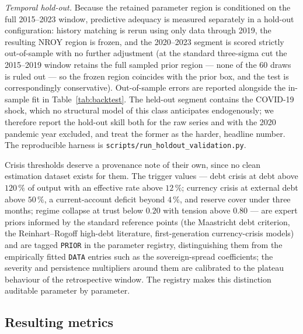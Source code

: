 \documentclass[a4paper,fleqn]{cas-sc}
\begin{document}
\emph{Temporal hold-out.} Because the retained parameter region is conditioned on the full
2015--2023 window, predictive adequacy is measured separately in a hold-out configuration:
history matching is rerun using only data through 2019, the resulting NROY region is
frozen, and the 2020--2023 segment is scored strictly out-of-sample with no further
adjustment (at the standard three-sigma cut the 2015--2019 window retains the full sampled
prior region --- none of the 60 draws is ruled out --- so the frozen region coincides with
the prior box, and the test is correspondingly conservative). Out-of-sample errors are
reported alongside the in-sample fit in Table~\ref{tab:backtest}. The held-out segment
contains the COVID-19 shock, which no structural model of this class anticipates
endogenously; we therefore report the hold-out skill both for the raw series and with the
2020 pandemic year excluded, and treat the former as the harder, headline number. The
reproducible harness is \texttt{scripts/run\_holdout\_validation.py}.

Crisis thresholds deserve a provenance note of their own, since no clean estimation dataset
exists for them. The trigger values --- debt crisis at debt above $120\,\%$ of output with an
effective rate above $12\,\%$; currency crisis at external debt above $50\,\%$, a
current-account deficit beyond $4\,\%$, and reserve cover under three months; regime collapse at
trust below $0.20$ with tension above $0.80$ --- are expert priors informed by the standard
reference points (the Maastricht debt criterion, the Reinhart--Rogoff high-debt literature,
first-generation currency-crisis models) and are tagged \texttt{PRIOR} in the parameter registry,
distinguishing them from the empirically fitted \texttt{DATA} entries such as the sovereign-spread
coefficients; the severity and persistence multipliers around them are calibrated to the
plateau behaviour of the retrospective window. The registry makes this distinction auditable
parameter by parameter.

\subsection{Resulting metrics}
\end{document}
